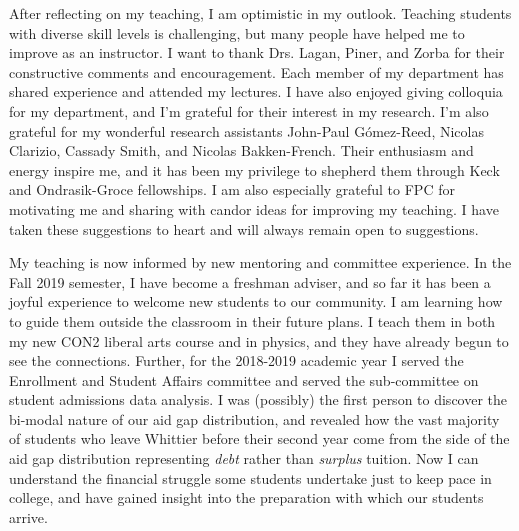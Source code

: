\documentclass[../../main.tex]{subfiles}
\begin{document}
After reflecting on my teaching, I am optimistic in my outlook.  Teaching students with diverse skill levels is challenging, but many people have helped me to improve as an instructor.  I want to thank Drs. Lagan, Piner, and Zorba for their constructive comments and encouragement.  Each member of my department has shared experience and attended my lectures.  I have also enjoyed giving colloquia for my department, and I'm grateful for their interest in my research.  I'm also grateful for my wonderful research assistants John-Paul G\'omez-Reed, Nicolas Clarizio, Cassady Smith, and Nicolas Bakken-French.  Their enthusiasm and energy inspire me, and it has been my privilege to shepherd them through Keck and Ondrasik-Groce fellowships. I am also especially grateful to FPC for motivating me and sharing with candor ideas for improving my teaching.  I have taken these suggestions to heart and will always remain open to suggestions.  \\ \hspace{0.1cm}

My teaching is now informed by new mentoring and committee experience.  In the Fall 2019 semester, I have become a freshman adviser, and so far it has been a joyful experience to welcome new students to our community.  I am learning how to guide them outside the classroom in their future plans.  I teach them in both my new CON2 liberal arts course and in physics, and they have already begun to see the connections.  Further, for the 2018-2019 academic year I served the Enrollment and Student Affairs committee and served the sub-committee on student admissions data analysis.  I was (possibly) the first person to discover the bi-modal nature of our aid gap distribution, and revealed how the vast majority of students who leave Whittier before their second year come from the side of the aid gap distribution representing \textit{debt} rather than \textit{surplus} tuition.  Now I can understand the financial struggle some students undertake just to keep pace in college, and have gained insight into the preparation with which our students arrive.  \\ \hspace{0.1cm}
\end{document}

